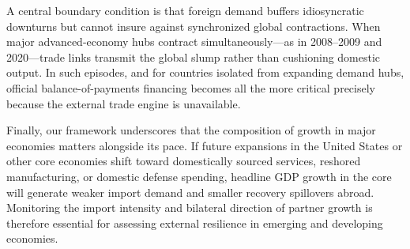 \documentclass[12pt, a4paper]{article}
\begin{document}
A central boundary condition is that foreign demand buffers idiosyncratic downturns but cannot insure against synchronized global contractions. When major advanced-economy hubs contract simultaneously---as in 2008--2009 and 2020---trade links transmit the global slump rather than cushioning domestic output. In such episodes, and for countries isolated from expanding demand hubs, official balance-of-payments financing becomes all the more critical precisely because the external trade engine is unavailable.

Finally, our framework underscores that the composition of growth in major economies matters alongside its pace. If future expansions in the United States or other core economies shift toward domestically sourced services, reshored manufacturing, or domestic defense spending, headline GDP growth in the core will generate weaker import demand and smaller recovery spillovers abroad. Monitoring the import intensity and bilateral direction of partner growth is therefore essential for assessing external resilience in emerging and developing economies.

\end{document}
